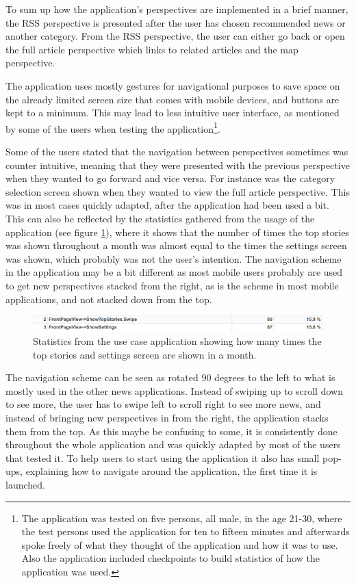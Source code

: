To sum up how the application's perspectives are implemented in a brief manner, the RSS perspective is presented after the user has chosen recommended news or another category. From the RSS perspective, the user can either go back or open the full article perspective which links to related articles and the map perspective.

The application uses mostly gestures for navigational purposes to save space on the already limited screen size that comes with mobile devices, and buttons are kept to a minimum. This may lead to less intuitive user interface, as mentioned by some of the users when testing the application\footnote{The application was tested on five persons, all male, in the age 21-30, where the test persons used the application for ten to fifteen minutes and afterwards spoke freely of what they thought of the application and how it was to use. Also the application included checkpoints to build statistics of how the application was used.}. 

Some of the users stated that the navigation between perspectives sometimes was counter intuitive, meaning that they were presented with the previous perspective when they wanted to go forward and vice versa. For instance was the category selection screen shown when they wanted to view the full article perspective. This was in most cases quickly adapted, after the application had been used a bit. This can also be reflected by the statistics gathered from the usage of the application (see figure \ref{usecase_usage_stats}), where it shows that the number of times the top stories was shown throughout a month was almost equal to the times the settings screen was shown, which probably was not the user's intention. The navigation scheme in the application may be a bit different as most mobile users probably are used to get new perspectives stacked from the right, as is the scheme in most mobile applications, and not stacked down from the top.

\begin{figure}[!htbp]
\centering
\includegraphics[width=130mm]{GFX/usecase/usageStats.png}
\caption{Statistics from the use case application showing how many times the top stories and settings screen are shown in a month.}
\label{usecase_usage_stats}
\end{figure}

The navigation scheme can be seen as rotated 90 degrees to the left to what is mostly used in the other news applications. Instead of swiping up to scroll down to see more, the user has to swipe left to scroll right to see more news, and instead of bringing new perspectives in from the right, the application stacks them from the top. As this maybe be confusing to some, it is consistently done throughout the whole application and was quickly adapted by most of the users that tested it. To help users to start using the application it also has small pop-ups, explaining how to navigate around the application, the first time it is launched.

